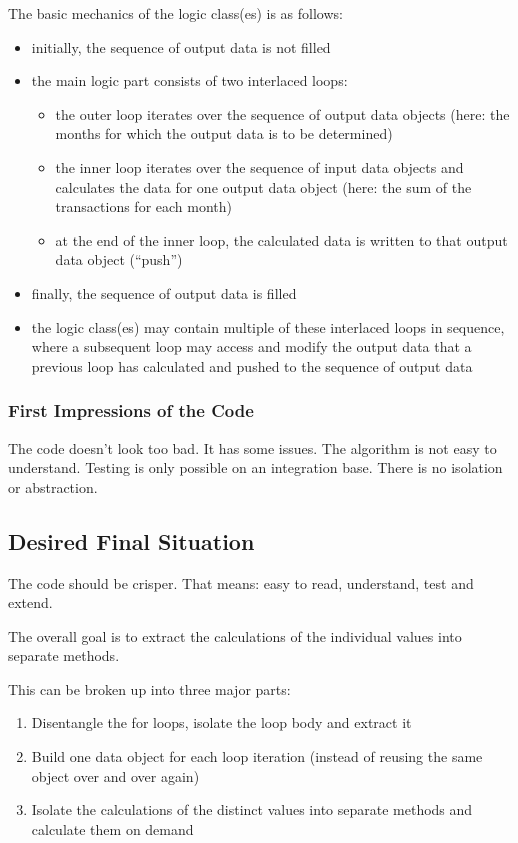 \documentclass[a4paper,fleqn,titlepage,11pt]{article}
\begin{document}
The basic mechanics of the logic class(es) is as follows:

\begin{itemize}
\item initially, the sequence of output data is not filled
\item the main logic part consists of two interlaced loops: 
\begin{itemize}
\item the outer loop iterates over the sequence of output data objects (here: the months for which the output data is to be determined)
\item the inner loop iterates over the sequence of input data objects and calculates the data for one output data object (here: the sum of the transactions for each month)
\item at the end of the inner loop, the calculated data is written to that output data object (``push'')
\end{itemize}
\item finally, the sequence of output data is filled
\item the logic class(es) may contain multiple of these interlaced loops in sequence, where a subsequent loop may access and modify the output data that a previous loop has calculated and pushed to the sequence of output data
\end{itemize}

\subsubsection*{First Impressions of the Code}
The code doesn't look too bad. It has some issues. The algorithm is not easy to understand. Testing is only possible on an integration base. There is no isolation or abstraction.

\subsection*{Desired Final Situation}

The code should be crisper. That means: easy to read, understand, test and extend.

The overall goal is to extract the calculations of the individual values into separate methods.

This can be broken up into three major parts:

\begin{enumerate}
\item Disentangle the for loops, isolate the loop body and extract it
\item Build one data object for each loop iteration (instead of reusing the same object over and over again)
\item Isolate the calculations of the distinct values into separate methods and calculate them on demand
\end{enumerate}
\end{document}
